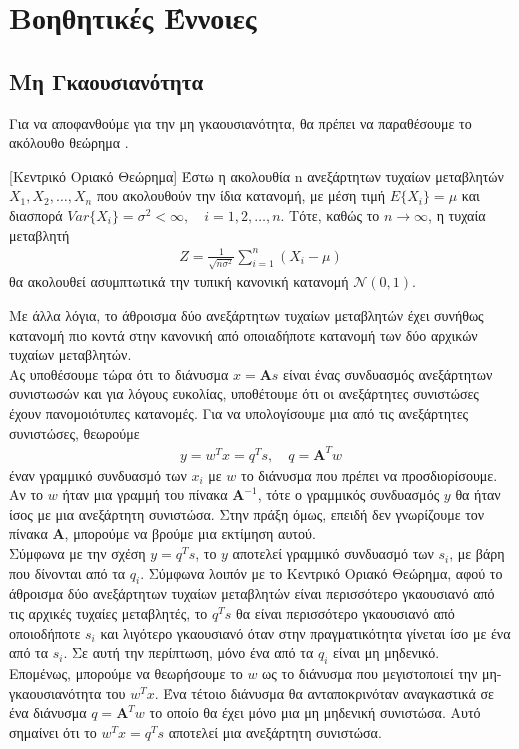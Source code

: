 \section{Βοηθητικές Έννοιες} \label{sec:3.2}
\subsection{Μη Γκαουσιανότητα} \label{sec:3.2.1}
Για να αποφανθούμε για την μη γκαουσιανότητα, θα πρέπει να παραθέσουμε το ακόλουθο θεώρημα \cite{cltheorem:8}.
\begin{theorem} \label{th:3.1} [Κεντρικό Οριακό Θεώρημα]
Έστω η ακολουθία \en n \gr ανεξάρτητων τυχαίων μεταβλητών \en $X_1, X_2, \ldots, X_n$ που ακολουθούν την ίδια κατανομή, με μέση τιμή \en $E\{X_i\} = \mu$ \gr και διασπορά \en $ Var\{X_i\} = \sigma ^2 < \infty, \quad i = 1,2,\ldots,n$. \gr Τότε, καθώς το \en $n \rightarrow \infty $, η τυχαία μεταβλητή \en
\begin{align*}
    Z = \frac{1}{\sqrt{n \sigma^2}} \sum\limits_{i=1}^{n} \left ( X_i - \mu \right )
\end{align*}
\gr θα ακολουθεί ασυμπτωτικά την τυπική κανονική κατανομή $\mathcal{N}(0,1)$.
\end{theorem} 
Με άλλα λόγια, το άθροισμα δύο ανεξάρτητων τυχαίων μεταβλητών έχει συνήθως κατανομή πιο κοντά στην κανονική από οποιαδήποτε κατανομή των δύο αρχικών τυχαίων μεταβλητών.
\\ [0.5\baselineskip]
Ας υποθέσουμε τώρα ότι το διάνυσμα \en $x = \mathbf{A} s$ \gr είναι ένας συνδυασμός ανεξάρτητων συνιστωσών και για λόγους ευκολίας, υποθέτουμε ότι οι ανεξάρτητες συνιστώσες έχουν πανομοιότυπες κατανομές. Για να υπολογίσουμε μια από τις ανεξάρτητες συνιστώσες, θεωρούμε 
\begin{align*}
    y = w^T x = q^T s, \quad q = \mathbf{A}^T w
\end{align*}
έναν γραμμικό συνδυασμό των \en $x_i$ \gr με \en $w$ \gr το διάνυσμα που πρέπει να προσδιορίσουμε.
\\
Αν το \en $w$ \gr ήταν μια γραμμή του πίνακα \en $\mathbf{A}^{-1}$, \gr τότε ο γραμμικός συνδυασμός \en $y$ \gr θα ήταν ίσος με μια ανεξάρτητη συνιστώσα. Στην πράξη όμως, επειδή δεν γνωρίζουμε τον πίνακα \en $\mathbf{A}$, \gr μπορούμε να βρούμε μια εκτίμηση αυτού.
\\[0.5 \baselineskip]
Σύμφωνα με την σχέση \en $y = q^T s$, \gr  το \en $y$ \gr αποτελεί γραμμικό συνδυασμό των \en $s_i$, \gr με βάρη που δίνονται από τα \en $q_i$. \gr Σύμφωνα λοιπόν με το Κεντρικό Οριακό Θεώρημα, αφού το άθροισμα δύο ανεξάρτητων τυχαίων μεταβλητών είναι περισσότερο γκαουσιανό από τις αρχικές τυχαίες μεταβλητές, το \en $q^T s$ \gr θα είναι περισσότερο γκαουσιανό από οποιοδήποτε \en $s_i$ \gr και λιγότερο γκαουσιανό όταν στην πραγματικότητα γίνεται ίσο με ένα από τα \en $s_i$. \gr Σε αυτή την περίπτωση, μόνο ένα από τα \en $q_i$ \gr είναι μη μηδενικό.
\\[0.5 \baselineskip]
Επομένως, μπορούμε να θεωρήσουμε το \en $w$ \gr ως το διάνυσμα που μεγιστοποιεί την μη-γκαουσιανότητα του \en $w^T x$. \gr Ένα τέτοιο διάνυσμα θα ανταποκρινόταν αναγκαστικά σε ένα διάνυσμα \en $ q = \mathbf{A}^T w $ \gr το οποίο θα έχει μόνο μια μη μηδενική συνιστώσα. Αυτό σημαίνει ότι το \en $w^T x = q^T s$ \gr αποτελεί μια ανεξάρτητη συνιστώσα.
